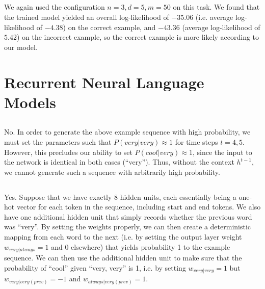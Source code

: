 \documentclass[psamsfonts]{amsart}
\theoremstyle{definition}
\theoremstyle{remark}
\numberwithin{equation}{section}
\begin{document}
\subsection{} We again used the configuration $n=3, d = 5, m = 50$ on this task. We found that the trained model yielded an overall log-likelihood of $-35.06$ (i.e. average log-likelihood of $-4.38$) on the correct example, and $-43.36$ (average log-likelihood of $5.42$) on the incorrect example, so the correct example is more likely according to our model.

\section{Recurrent Neural Language Models}

\subsection{} No. In order to generate the above example sequence with high probability, we must set the parameters such that $P(very|very) \approx 1$ for time steps $t = 4, 5$. However, this precludes our ability to set $P(cool|very) \approx 1$, since the input to the network is identical in both cases (``very''). Thus, without the context $h^{t-1}$, we cannot generate such a sequence with arbitrarily high probability.

\subsection{} Yes. Suppose that we have exactly $8$ hidden units, each essentially being a one-hot vector for each token in the sequence, including start and end tokens. We also have one additional hidden unit that simply records whether the previous word was ``very''. By setting the weights properly, we can then create a deterministic mapping from each word to the next (i.e. by setting the output layer weight $w_{very|always} = 1$ and 0 elsewhere) that yields probability 1 to the example sequence. We can then use the additional hidden unit to make sure that the probability of ``cool'' given ``very, very'' is 1, i.e. by setting $w_{very|very} = 1$ but $w_{very|very(prev)} = -1$ and $w_{always|very(prev)} = 1$.
\end{document}
